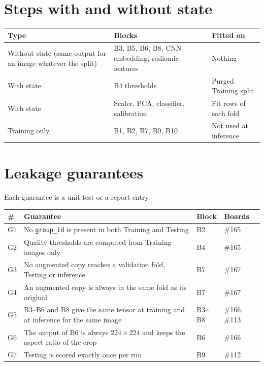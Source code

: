 \documentclass[11pt,a4paper]{article}
\newcommand{\board}[1]{\textsf{\##1}}
\begin{document}
\section{Steps with and without state}

\begin{center}
\begin{tabularx}{\textwidth}{@{}L L L@{}}
\toprule
Type & Blocks & Fitted on \\
\midrule
Without state (same output for an image whatever the split) & B3, B5, B6, B8, CNN embedding, radiomic features & Nothing \\
With state & B4 thresholds & Purged Training split \\
With state & Scaler, PCA, classifier, calibration & Fit rows of each fold \\
Training only & B1, B2, B7, B9, B10 & Not used at inference \\
\bottomrule
\end{tabularx}
\end{center}

\section{Leakage guarantees}\label{sec:guarantees}

Each guarantee is a unit test or a report entry.

\begin{center}
\begin{tabularx}{\textwidth}{@{}l L l l@{}}
\toprule
\# & Guarantee & Block & Boards \\
\midrule
G1 & No \texttt{group\_id} is present in both Training and Testing & B2 & \board{165} \\
G2 & Quality thresholds are computed from Training images only & B4 & \board{165} \\
G3 & No augmented copy reaches a validation fold, Testing or inference & B7 & \board{167} \\
G4 & An augmented copy is always in the same fold as its original & B7 & \board{167} \\
G5 & B3--B6 and B8 give the same tensor at training and at inference for the same image & B3--B8 & \board{166}, \board{113} \\
G6 & The output of B6 is always $224\times224$ and keeps the aspect ratio of the crop & B6 & \board{166} \\
G7 & Testing is scored exactly once per run & B9 & \board{112} \\
\bottomrule
\end{tabularx}
\end{center}
\end{document}
